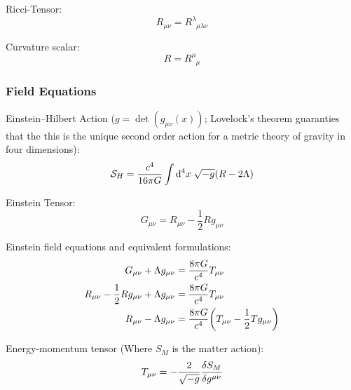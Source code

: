 			\noindent
			Ricci-Tensor:
			\begin{equation}
				R_{\mu\nu} = R^\lambda_{\phantom{\lambda}\mu\lambda\nu}
			\end{equation}

			\noindent
			Curvature scalar:
			\begin{equation}
				R = R^\mu_{\phantom{\mu}\mu}
			\end{equation}

		\subsubsection{Field Equations}
			\noindent
			Einstein--Hilbert Action ($g=\det(g_{\mu\nu}(x))$; Lovelock's theorem guaranties that the this is the unique second order action for a metric theory of gravity in four dimensions):
			\begin{equation}
				\mathcal{S}_H = \frac{c^4}{16\pi G} \int\dd^4 x\; \sqrt{-g} \qty(R - 2\Lambda)
			\end{equation}

			\noindent
			Einstein Tensor:
			\begin{equation}
				G_{\mu\nu} = R_{\mu\nu} - \frac{1}{2} R g_{\mu\nu}
			\end{equation}

			\noindent
			Einstein field equations and equivalent formulations:
			\begin{align}
				G_{\mu\nu} + \Lambda g_{\mu\nu} &= \frac{8\pi G}{c^4} T_{\mu\nu} \\
				R_{\mu\nu} - \frac{1}{2} R g_{\mu\nu} + \Lambda g_{\mu\nu} &= \frac{8\pi G}{c^4} T_{\mu\nu} \\
				R_{\mu\nu} - \Lambda g_{\mu\nu}&= \frac{8\pi G}{c^4} \qty( T_{\mu\nu} - \frac{1}{2} T g_{\mu\nu} )
			\end{align}

			\noindent
			Energy-momentum tensor (Where $S_M$ is the matter action):
			\begin{equation}
				T_{\mu\nu} = -\frac{2}{\sqrt{-g}} \fdv{S_M}{g^{\mu\nu}}
			\end{equation}


